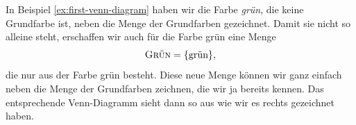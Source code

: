 \documentclass[../../main.tex]{subfiles}
\begin{document}
\begin{example}{}

    In Beispiel \ref{ex:first-venn-diagram} haben wir die Farbe \emph{grün}, die keine Grundfarbe ist, neben die Menge der Grundfarben gezeichnet. Damit sie nicht so alleine steht, erschaffen wir auch für die Farbe grün eine Menge
    \[\textsc{Grün}=\{\text{grün}\},\]
    die nur aus der Farbe grün besteht. Diese neue Menge können wir ganz einfach neben die Menge der Grundfarben zeichnen, die wir ja bereits kennen. Das entsprechende Venn-Diagramm sieht dann so aus wie wir es rechts gezeichnet haben.
\end{example}
\end{document}

